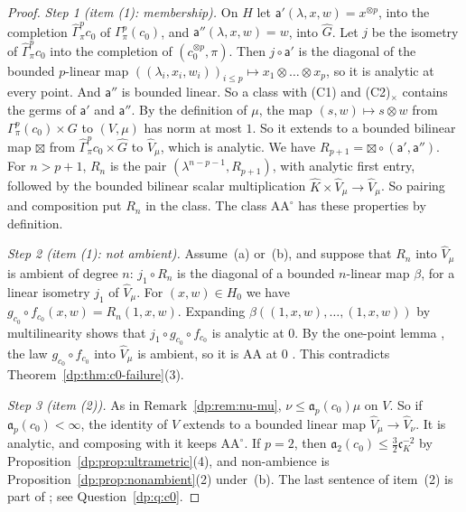 \documentclass[11pt]{amsart}
\theoremstyle{definition}
\theoremstyle{remark}
\numberwithin{equation}{section}
\newcommand{\Kh}{\widehat K}
\theoremstyle{plain}
\theoremstyle{definition}
\theoremstyle{plain}
\newcommand{\hGamma}{\widehat\Gamma}
\begin{document}
\begin{proof}
\emph{Step 1 (item (1): membership).} On $H$ let $\mathsf a'(\lambda,x,w)=x^{\otimes p}$, into the completion $\hGamma^p_\pi c_0$ of $\Gamma^p_\pi(c_0)$, and $\mathsf a''(\lambda,x,w)=w$, into $\widehat G$. Let $j$ be the isometry of $\hGamma^p_\pi c_0$ into the completion of $(c_0^{\otimes p},\pi)$. Then $j\circ\mathsf a'$ is the diagonal of the bounded $p$\nobreakdash-linear map $((\lambda_i,x_i,w_i))_{i\le p}\mapsto x_1\otimes\dots\otimes x_p$, so it is analytic at every point. And $\mathsf a''$ is bounded linear. So a class with (C1) and (C2)$_\times$ contains the germs of $\mathsf a'$ and $\mathsf a''$. By the definition of $\mu$, the map $(s,w)\mapsto s\otimes w$ from $\Gamma^p_\pi(c_0)\times G$ to $(V,\mu)$ has norm at most $1$. So it extends to a bounded bilinear map $\boxtimes$ from $\hGamma^p_\pi c_0\times\widehat G$ to $\widehat V_\mu$, which is analytic. We have $R_{p+1}=\boxtimes\circ(\mathsf a',\mathsf a'')$. For $n>p+1$, $R_n$ is the pair $(\lambda^{n-p-1},R_{p+1})$, with analytic first entry, followed by the bounded bilinear scalar multiplication $\Kh\times\widehat V_\mu\to\widehat V_\mu$. So pairing and composition put $R_n$ in the class. The class $\mathrm{AA}^\circ$ has these properties by definition.

\emph{Step 2 (item (1): not ambient).} Assume~(a) or~(b), and suppose that $R_n$ into $\widehat V_\mu$ is ambient of degree $n$: $j_1\circ R_n$ is the diagonal of a bounded $n$\nobreakdash-linear map $\beta$, for a linear isometry $j_1$ of $\widehat V_\mu$. For $(x,w)\in H_0$ we have $g_{c_0}\circ f_{c_0}(x,w)=R_n(1,x,w)$. Expanding $\beta((1,x,w),\dots,(1,x,w))$ by multilinearity shows that $j_1\circ g_{c_0}\circ f_{c_0}$ is analytic at $0$. By the one-point lemma \cite[Proposition~14.9(2)]{I}, the law $g_{c_0}\circ f_{c_0}$ into $\widehat V_\mu$ is ambient, so it is AA at $0$ \cite[Proposition~14.9(1)]{I}. This contradicts Theorem~\ref{dp:thm:c0-failure}(3).

\emph{Step 3 (item (2)).} As in Remark~\ref{dp:rem:nu-mu}, $\nu\le\mathfrak a_p(c_0)\mu$ on $V$. So if $\mathfrak a_p(c_0)<\infty$, the identity of $V$ extends to a bounded linear map $\widehat V_\mu\to\widehat V_\nu$. It is analytic, and composing with it keeps $\mathrm{AA}^\circ$. If $p=2$, then $\mathfrak a_2(c_0)\le\frac32\mathfrak c_K^{-2}$ by Proposition~\ref{dp:prop:ultrametric}(4), and non-ambience is Proposition~\ref{dp:prop:nonambient}(2) under~(b). The last sentence of item~(2) is part of \cite[Question~14.42(4)]{I}; see Question~\ref{dp:q:c0}.


\end{proof}
\end{document}
